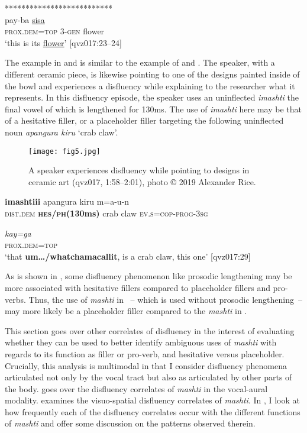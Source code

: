 \documentclass[output=paper]{langscibook}
\begin{document}
\ex \label{ex:rice:20b}
\gl***************************\\
 {pay-ba}  {\uline{sisa}}\\
{\textsc{prox.dem=top}}  {3-\textsc{gen}} {flower}\\
\glt    ‘this is its \uline{flower}’ [qvz017:23--24]
\z\z

The example in  and  is similar to the example of  and . The speaker, with a different ceramic piece, is likewise pointing to one of the designs painted inside of the bowl and experiences a disfluency while explaining to the researcher what it represents. In this disfluency episode, the speaker uses an uninflected \textit{imashti} the final vowel of which is lengthened for 130ms. The use of \textit{imashti} here may be that of a hesitative filler, or a placeholder filler targeting the following uninflected noun \textit{apangura kiru} ‘crab claw’.

  
\begin{figure}
\texttt{[image: fig5.jpg]}
\caption{\label{fig:rice:5} A speaker experiences disfluency while pointing to designs in ceramic art (qvz017, 1:58--2:01), photo © 2019 Alexander Rice.}
 \end{figure}


\ea%
\label{ex:rice:21}
 {\textbf{imashtiii}} {apangura}  {kiru}  {m=a-u-n} \\
{\textsc{dist.dem}}  {\textbf{\textsc{hes/ph}}\textbf{(130ms)}}  {crab}    {claw}  {\textsc{ev.s=cop-prog-3sg}}\\
\medskip

\gll \textit{kay=ga}\\
\textsc{prox.dem=top}\\
\glt ‘that \textbf{um…/whatchamacallit}, is a crab claw, this one’ [qvz017:29]
\z

As is shown in , some disfluency phenomenon like prosodic lengthening may be more associated with hesitative fillers compared to placeholder fillers and pro-verbs. Thus, the use of \textit{mashti} in ~--  which is used without prosodic lengthening~-- may more likely be a placeholder filler compared to the \textit{mashti} in . 

This section goes over other correlates of disfluency in the interest of evaluating whether they can be used to better identify ambiguous uses of \textit{mashti} with regards to its function as filler or pro-verb, and hesitative versus placeholder. Crucially, this analysis is multimodal in that I consider disfluency phenomena articulated not only by the vocal tract but also as articulated by other parts of the body.  goes over the disfluency correlates of \textit{mashti} in the vocal-aural modality.  examines the visuo-spatial disfluency correlates of \textit{mashti}. In , I look at how frequently each of the disfluency correlates occur with the different functions of \textit{mashti} and offer some discussion on the patterns observed therein.
\end{document}
